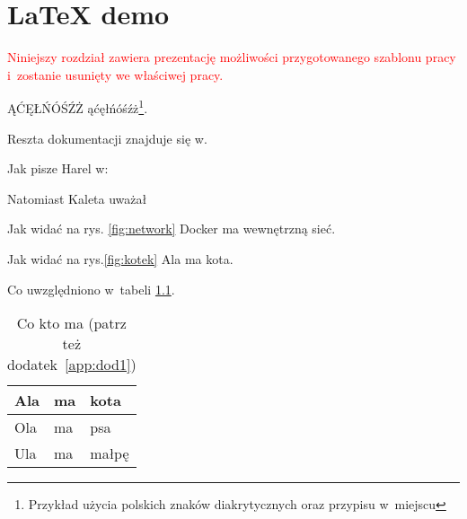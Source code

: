 
\chapter{LaTeX demo}

\textcolor{red}{
    Niniejszy rozdział zawiera prezentację możliwości przygotowanego szablonu pracy
    i~zostanie usunięty we właściwej pracy.
}

ĄĆĘŁŃÓŚŹŻ ąćęłńóśźż\footnote{Przykład użycia polskich znaków diakrytycznych oraz przypisu w~miejscu}.

Reszta dokumentacji znajduje się w.

Jak pisze Harel w: \lipsum[1]

Natomiast Kaleta uważał \lipsum[1]

Jak widać na rys. \ref{fig:network} Docker ma wewnętrzną sieć.


Jak widać na rys.\ref{fig:kotek} Ala ma kota. \lipsum[1]


Co uwzględniono w~tabeli \ref{tabela:coktoma}. \lipsum[1]

\noindent\begin{minipage}{\textwidth}
    \begin{table}[H]
        \raggedright\caption{Co kto ma (patrz też dodatek~\ref{app:dod1}) \label{tabela:coktoma}}
        \begin{center}\begin{tabular}{|l|l|l|}%
                          \hline
                          Ala & ma & kota \\
                          \hline
                          Ola & ma & psa \\
                          \hline
                          Ula & ma & małpę\\
                          \hline
        \end{tabular}\end{center}
        \raggedright{}
        \vspace{0.75cm}
    \end{table}
\end{minipage}

